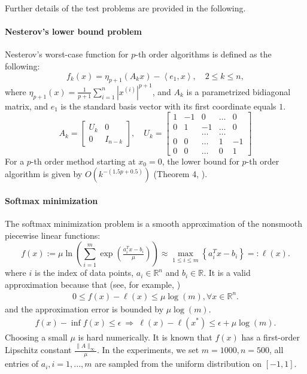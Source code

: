 \documentclass{article}
\theoremstyle{plain}
\theoremstyle{definition}
\theoremstyle{remark}
\begin{document}
Further details of the test problems are provided in the following.
\paragraph{Nesterov's lower bound problem}\label{sec.experiments.nesterov}
Nesterov's worst-case function for $p$-th order algorithms \cite{nesterovImplementableTensorMethods2021} is defined as the following:
\[
    f_k(x) = \eta_{p+1}\left(A_k x\right) - \left\langle e_1, x\right\rangle, \quad 2 \leq k \leq n,
\]
where $\eta_{p+1}(x) = \tfrac{1}{p+1}\sum_{i=1}^n |x^{(i)}|^{p+1}$, and $A_k$ is a parametrized bidiagonal matrix, and $e_1$ is the standard basis vector with its first coordinate equals $1$.
\small
$$A_k=\left[\begin{array}{cc}U_k & 0 \\ 0 & I_{n-k}\end{array}\right], \quad U_k=\left[\begin{array}{rrccr}1 & -1 & 0 & \ldots & 0 \\ 0 & 1 & -1 & \ldots & 0 \\ & & \ldots & \ldots & \\ 0 & 0 & \ldots & 1 & -1 \\ 0 & 0 & \ldots & 0 & 1\end{array}\right]$$
\normalsize
For a $p$-th order method starting at $x_0 = 0$, the lower bound for $p$-th order algorithm is given by
$O\left(k^{-(1.5p+0.5)}\right)$ (Theorem 4, \cite{nesterovImplementableTensorMethods2021}).
\paragraph{Softmax minimization}
The softmax minimization problem is a smooth approximation of the nonsmooth piecewise linear functions:
$$
    f(x) := \mu \ln \left(\sum_{i=1}^m \exp \left(\tfrac{a_i^Tx - b_i}{\mu}\right)\right) \approx \max_{1 \leq i \leq m} \left\{a_i^T x - b_i\right\} =: \ell(x).
$$
where $i$ is the index of data points, $a_i \in \mathbb{R}^n$ and $b_i \in \mathbb{R}$.
It is a valid approximation because that (see, for example, \cite{beckSmoothingFirstOrder2012})
\begin{align*}
    0 \le  f(x) - \ell(x) \le \mu \log(m), \forall x \in \mathbb{R}^n.
\end{align*}
and the approximation error is bounded by $\mu \log(m)$.
\begin{align*}
    f(x) - \inf f(x) \le \epsilon ~\Rightarrow ~ \ell(x) - \ell(x^*) \le \epsilon + \mu \log(m).
\end{align*}
Choosing a small $\mu$ is hard numerically.
It is known that $f(x)$ has a first-order Lipschitz constant $\tfrac{\|A\|_\infty}{\mu}$. In the experiments, we set $m = 1000, n = 500$, all entries of $a_i, i=1,...,m$ are sampled from the uniform distribution on $[-1,1]$.
\end{document}
